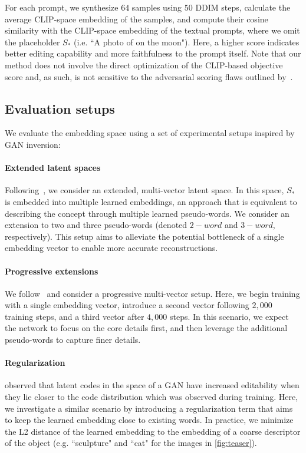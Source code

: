 For each prompt, we synthesize $64$ samples using $50$ DDIM steps, calculate the average CLIP-space embedding of the samples, and compute their cosine similarity with the CLIP-space embedding of the textual prompts, where we omit the placeholder $S_*$ (i.e. ``A photo of on the moon"). Here, a higher score indicates better editing capability and more faithfulness to the prompt itself. Note that our method does not involve the direct optimization of the CLIP-based objective score and, as such, is not sensitive to the adversarial scoring flaws outlined by~\citet{nichol2021glide}.

\subsection{Evaluation setups}

We evaluate the embedding space using a set of experimental setups inspired by GAN inversion:

\paragraph{Extended latent spaces}
Following~\citet{abdal2019image2stylegan}, we consider an extended, multi-vector latent space. In this space, $S_*$ is embedded into multiple learned embeddings, an approach that is equivalent to describing the concept through multiple learned pseudo-words. We consider an extension to two and three pseudo-words (denoted $2-word$ and $3-word$, respectively). This setup aims to alleviate the potential bottleneck of a single embedding vector to enable more accurate reconstructions.

\paragraph{Progressive extensions} We follow~\citet{tov2021designing} and consider a progressive multi-vector setup. Here, we begin training with a single embedding vector, introduce a second vector following $2,000$ training steps, and a third vector after $4,000$ steps. In this scenario, we expect the network to focus on the core details first, and then leverage the additional pseudo-words to capture finer details.

\paragraph{Regularization}
\citet{tov2021designing} observed that latent codes in the space of a GAN have increased editability when they lie closer to the code distribution which was observed during training. Here, we investigate a similar scenario by introducing a regularization term that aims to keep the learned embedding close to existing words. In practice, we minimize the L2 distance of the learned embedding to the embedding of a coarse descriptor of the object (e.g. ``sculpture" and ``cat" for the images in \ref{fig:teaser}).

